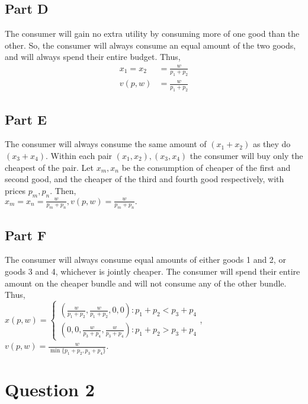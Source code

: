 \documentclass[11pt]{article} %
\begin{document}
\subsection{Part D}
The consumer will gain no extra utility by consuming more of one good than the other. So, the consumer will always consume an equal amount of the two goods, and will always spend their entire budget. Thus,
\begin{align*}
x_1 = x_2 &= \frac{w}{p_1+p_2}\\
v(p,w) &=\frac{w}{p_1+p_2}
\end{align*}
\subsection{Part E}
The consumer will always consume the same amount of $(x_1+x_2)$ as they do $(x_3 + x_4)$. Within each pair $(x_1,x_2),(x_3,x_4)$ the consumer will buy only the cheapest of the pair. Let $x_m,x_n$ be the consumption of cheaper of the first and second good, and the cheaper of the third and fourth good respectively, with prices $p_m,p_n$. Then,\\ $x_m = x_n = \frac{w}{p_m + p_n},v(p,w) = \frac{w}{p_m + p_n}.$
\subsection{Part F}
The consumer will always consume equal amounts of either goods 1 and 2, or goods 3 and 4, whichever is jointly cheaper. The consumer will spend their entire amount on the cheaper bundle and will not consume any of the other bundle. Thus,\\
$x(p,w) = \begin{cases} \left( \frac{w}{p_1+p_2},\frac{w}{p_1+p_2},0,0\right) : p_1+p_2<p_3+p_4 \\ \left( 0,0,\frac{w}{p_3+p_4},\frac{w}{p_3+p_4}\right) : p_1+p_2>p_3+p_4 \end{cases}$,
$v(p,w) = \frac{w}{\min \{ p_1+p_2,p_3+p_4\}}$.
\section{Question 2}
\end{document}
